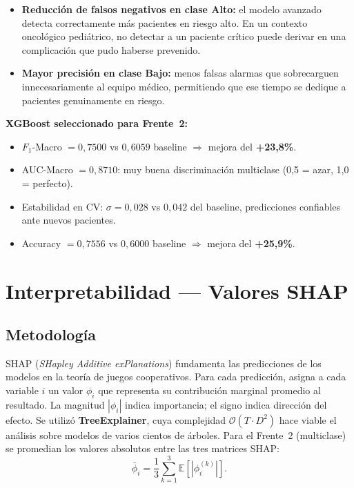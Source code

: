 \documentclass[12pt, a4paper]{article}
\begin{document}
\begin{itemize}[leftmargin=1.5em, itemsep=3pt]
  \item \textbf{Reducci\'on de falsos negativos en clase Alto:} el modelo avanzado detecta correctamente m\'as pacientes en riesgo alto. En un contexto oncol\'ogico pedi\'atrico, no detectar a un paciente cr\'itico puede derivar en una complicaci\'on que pudo haberse prevenido.
  \item \textbf{Mayor precisi\'on en clase Bajo:} menos falsas alarmas que sobrecarguen innecesariamente al equipo m\'edico, permitiendo que ese tiempo se dedique a pacientes genuinamente en riesgo.
\end{itemize}

\begin{successbox}
\textbf{XGBoost seleccionado para Frente~2:}
\begin{itemize}[leftmargin=1.5em, itemsep=3pt]
  \item $F_1$-Macro $= 0{,}7500$ vs $0{,}6059$ baseline $\Rightarrow$ mejora del \textbf{+23{,}8\%}.
  \item AUC-Macro $= 0{,}8710$: muy buena discriminaci\'on multiclase (0{,}5 = azar, 1{,}0 = perfecto).
  \item Estabilidad en CV: $\sigma = 0{,}028$ vs $0{,}042$ del baseline, predicciones confiables ante nuevos pacientes.
  \item Accuracy $= 0{,}7556$ vs $0{,}6000$ baseline $\Rightarrow$ mejora del \textbf{+25{,}9\%}.
\end{itemize}
\end{successbox}

\newpage

\section{Interpretabilidad --- Valores SHAP}

\subsection{Metodolog\'ia}

SHAP (\textit{SHapley Additive exPlanations}) fundamenta las predicciones de los modelos en la teor\'ia de juegos cooperativos. Para cada predicci\'on, asigna a cada variable $i$ un valor $\phi_i$ que representa su contribuci\'on marginal promedio al resultado. La magnitud $|\phi_i|$ indica importancia; el signo indica direcci\'on del efecto. Se utiliz\'o \textbf{TreeExplainer}, cuya complejidad $\mathcal{O}(T \cdot D^2)$ hace viable el an\'alisis sobre modelos de varios cientos de \'arboles. Para el Frente~2 (multiclase) se promedian los valores absolutos entre las tres matrices SHAP:
\[
  \bar{\phi}_i = \frac{1}{3}\sum_{k=1}^{3} \mathbb{E}\!\left[|\phi_i^{(k)}|\right].
\]
\end{document}
